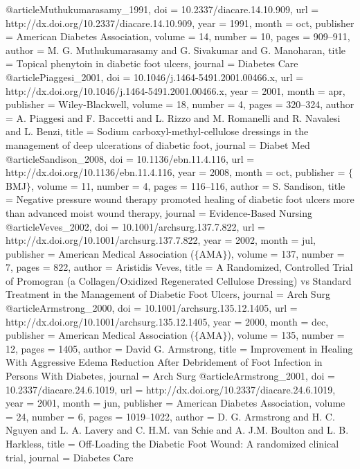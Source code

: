 @article{Muthukumarasamy_1991,
	doi = {10.2337/diacare.14.10.909},
	url = {http://dx.doi.org/10.2337/diacare.14.10.909},
	year = 1991,
	month = {oct},
	publisher = {American Diabetes Association},
	volume = {14},
	number = {10},
	pages = {909--911},
	author = {M. G. Muthukumarasamy and G. Sivakumar and G. Manoharan},
	title = {Topical phenytoin in diabetic foot ulcers},
	journal = {Diabetes Care}
}
@article{Piaggesi_2001,
	doi = {10.1046/j.1464-5491.2001.00466.x},
	url = {http://dx.doi.org/10.1046/j.1464-5491.2001.00466.x},
	year = 2001,
	month = {apr},
	publisher = {Wiley-Blackwell},
	volume = {18},
	number = {4},
	pages = {320--324},
	author = {A. Piaggesi and F. Baccetti and L. Rizzo and M. Romanelli and R. Navalesi and L. Benzi},
	title = {Sodium carboxyl-methyl-cellulose dressings in the management of deep ulcerations of diabetic foot},
	journal = {Diabet Med}
}
@article{Sandison_2008,
	doi = {10.1136/ebn.11.4.116},
	url = {http://dx.doi.org/10.1136/ebn.11.4.116},
	year = 2008,
	month = {oct},
	publisher = {$\lbrace$BMJ$\rbrace$},
	volume = {11},
	number = {4},
	pages = {116--116},
	author = {S. Sandison},
	title = {Negative pressure wound therapy promoted healing of diabetic foot ulcers more than advanced moist wound therapy},
	journal = {Evidence-Based Nursing}
}
@article{Veves_2002,
	doi = {10.1001/archsurg.137.7.822},
	url = {http://dx.doi.org/10.1001/archsurg.137.7.822},
	year = 2002,
	month = {jul},
	publisher = {American Medical Association ($\lbrace$AMA$\rbrace$)},
	volume = {137},
	number = {7},
	pages = {822},
	author = {Aristidis Veves},
	title = {A Randomized, Controlled Trial of Promogran (a Collagen/Oxidized Regenerated Cellulose Dressing) vs Standard Treatment in the Management of Diabetic Foot Ulcers},
	journal = {Arch Surg}
}
@article{Armstrong_2000,
	doi = {10.1001/archsurg.135.12.1405},
	url = {http://dx.doi.org/10.1001/archsurg.135.12.1405},
	year = 2000,
	month = {dec},
	publisher = {American Medical Association ($\lbrace$AMA$\rbrace$)},
	volume = {135},
	number = {12},
	pages = {1405},
	author = {David G. Armstrong},
	title = {Improvement in Healing With Aggressive Edema Reduction After Debridement of Foot Infection in Persons With Diabetes},
	journal = {Arch Surg}
}
@article{Armstrong_2001,
	doi = {10.2337/diacare.24.6.1019},
	url = {http://dx.doi.org/10.2337/diacare.24.6.1019},
	year = 2001,
	month = {jun},
	publisher = {American Diabetes Association},
	volume = {24},
	number = {6},
	pages = {1019--1022},
	author = {D. G. Armstrong and H. C. Nguyen and L. A. Lavery and C. H.M. van Schie and A. J.M. Boulton and L. B. Harkless},
	title = {Off-Loading the Diabetic Foot Wound: A randomized clinical trial},
	journal = {Diabetes Care}
}
